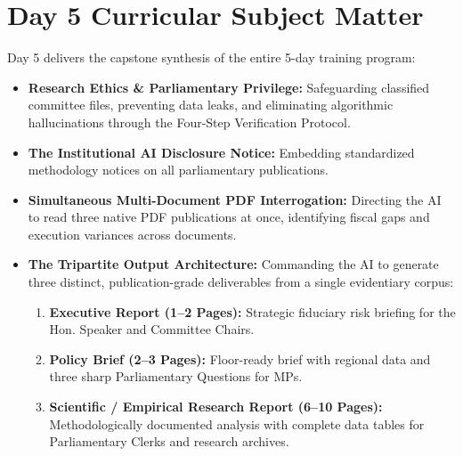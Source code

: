 \documentclass[11pt, a4paper]{report}
\begin{document}
\section{Day 5 Curricular Subject Matter}
Day 5 delivers the capstone synthesis of the entire 5-day training program:
\begin{itemize}[label=-]
    \item \textbf{Research Ethics \& Parliamentary Privilege:} Safeguarding classified committee files, preventing data leaks, and eliminating algorithmic hallucinations through the Four-Step Verification Protocol.
    \item \textbf{The Institutional AI Disclosure Notice:} Embedding standardized methodology notices on all parliamentary publications.
    \item \textbf{Simultaneous Multi-Document PDF Interrogation:} Directing the AI to read three native PDF publications at once, identifying fiscal gaps and execution variances across documents.
    \item \textbf{The Tripartite Output Architecture:} Commanding the AI to generate three distinct, publication-grade deliverables from a single evidentiary corpus:
    \begin{enumerate}
        \item \textbf{Executive Report (1--2 Pages):} Strategic fiduciary risk briefing for the Hon. Speaker and Committee Chairs.
        \item \textbf{Policy Brief (2--3 Pages):} Floor-ready brief with regional data and three sharp Parliamentary Questions for MPs.
        \item \textbf{Scientific / Empirical Research Report (6--10 Pages):} Methodologically documented analysis with complete data tables for Parliamentary Clerks and research archives.
    \end{enumerate}
\end{itemize}
\end{document}
